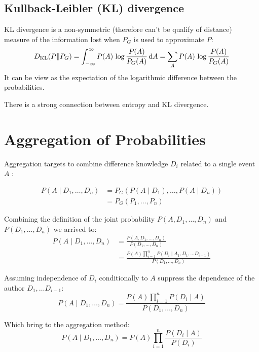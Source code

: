 \documentclass[twocolumn]{article}
\numberwithin{equation}{section}
\begin{document}
	\subsection{Kullback-Leibler (KL) divergence}
KL divergence is a non-symmetric (therefore can't be qualify of distance) measure of the information lost when $P_G$ is used to approximate $P$:
$$D_{\mathrm{KL}}(P\|P_G) = \int_{-\infty}^\infty P(A) \, \log\frac{P(A)}{P_G(A)} \, {\rm d}A =\sum_A P(A) \, \log\frac{P(A)}{P_G(A)}$$
It can be view as the expectation of the logarithmic difference between the probabilities.

There is a strong connection between entropy and KL divergence.

\newpage
\section{Aggregation of Probabilities}
Aggregation targets to combine difference knowledge $D_i$ related to a single event $A$ :
\begin{framed}
\begin{align*} 
P(A \mid D_1,\ldots,D_n)	&= P_G\left(P(A \mid D_1), \ldots, P(A \mid D_n)\right)\\ 
						&= P_G\left(P_1, \ldots, P_n \right)
\end{align*}
\end{framed}

Combining the definition of the joint probability $P(A, D_1,\ldots,D_n)$ and $P(D_1,\ldots,D_n)$ we arrived to:
\begin{align*} 
P(A \mid D_1,\ldots,D_n)	&= \frac{P(A, D_1,\ldots,D_n)}{P(D_1,\ldots,D_n)} \\
							&= \frac{P(A) \prod_{i=1}^n  P(D_i \mid A_1, D_1, \ldots D_{i-1}) }{P(D_1,\ldots,D_n)}
\end{align*}


Assuming independence of $D_i$ conditionally to $A$  suppress the dependence of the author $D_1, \ldots D_{i-1}$:
$$P(A \mid D_1,\ldots,D_n) = \frac{P(A) \prod_{i=1}^n  P(D_i \mid A) }{P(D_1,\ldots,D_n)}$$


Which bring to the aggregation method:
$$P(A \mid D_1,\ldots,D_n)=P(A) \prod_{i=1}^n \frac{P(D_i \mid A)}{P(D_i)}$$
\end{document}
